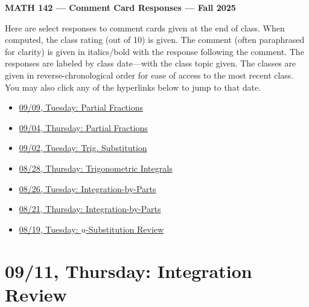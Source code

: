 \documentclass[11pt,letterpaper]{article}
\begin{document}
\begin{center} {\bfseries \LARGE MATH 142 --- Comment Card Responses --- Fall 2025} \end{center}

Here are select responses to comment cards given at the end of class. When computed, the class rating (out of 10) is given. The comment (often paraphrased for clarity) is given in italics/bold with the response following the comment. The responses are labeled by class date---with the class topic given. The classes are given in reverse-chronological order for ease of access to the most recent class. You may also click any of the hyperlinks below to jump to that date.

\begin{itemize}
\item \hyperref[09-09]{09/09, Tuesday: Partial Fractions}
\item \hyperref[09-04]{09/04, Thursday: Partial Fractions}
\item \hyperref[09-02]{09/02, Tuesday: Trig. Substitution}
\item \hyperref[08-28]{08/28, Thursday: Trigonometric Integrals}
\item \hyperref[08-26]{08/26, Tuesday: Integration-by-Parts}
\item \hyperref[08-21]{08/21, Thursday: Integration-by-Parts}
\item \hyperref[08-19]{08/19, Tuesday: $u$-Substitution Review}
\end{itemize}

\newpage
\section*{09/11, Thursday: Integration Review\label{09-11}}
\end{document}
